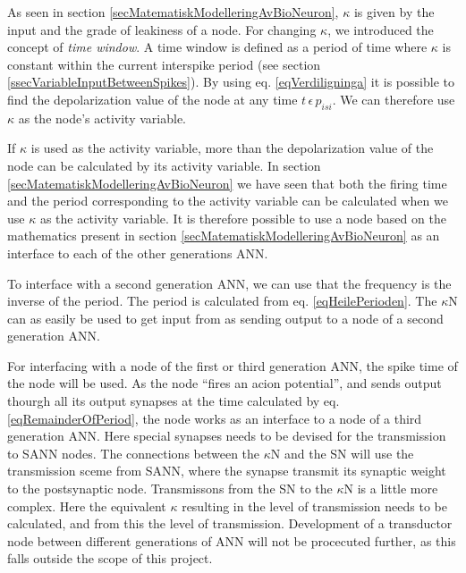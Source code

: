 	As seen in section \ref{secMatematiskModelleringAvBioNeuron}, $\kappa$ is given by the input and the grade of leakiness of a node.
	For changing $\kappa$, we introduced the concept of \emph{time window}. 
	A time window is defined as a period of time where $\kappa$ is constant within the current interspike period (see section \ref{ssecVariableInputBetweenSpikes}).
	By using eq. \eqref{eqVerdiligninga} it is possible to find the depolarization value of the node at any time $t \, \epsilon \, p_{isi}$.
	We can therefore use $\kappa$ as the node's activity variable.

	If $\kappa$ is used as the activity variable, more than the depolarization value of the node can be calculated by its activity variable. 
	In section \ref{secMatematiskModelleringAvBioNeuron} we have seen that both the firing time and the period corresponding to the activity variable can be calculated when we use $\kappa$ as the activity variable.
	It is therefore possible to use a node based on the mathematics present in section \ref{secMatematiskModelleringAvBioNeuron} as an interface to each of the other generations ANN.

	To interface with a second generation ANN, we can use that the frequency is the inverse of the period. The period is calculated from eq. \eqref{eqHeilePerioden}.
	The $\kappa$N can as easily be used to get input from as sending output to a node of a second generation ANN.

	For interfacing with a node of the first or third generation ANN, the spike time of the node will be used. %
	As the node ``fires an acion potential'', and sends output thourgh all its output synapses at the time calculated by eq. \eqref{eqRemainderOfPeriod}, the node works as an interface to a node of a third generation ANN. 
	Here special synapses needs to be devised for the transmission to SANN nodes. 
	The connections between the $\kappa$N and the SN will use the transmission sceme from SANN, where the synapse transmit its synaptic weight to the postsynaptic node. 
	Transmissons from the SN to  the $\kappa$N is a little more complex. Here the equivalent $\kappa$ resulting in the level of transmission needs to be calculated, and from this the level of transmission.
	Development of a transductor node between different generations of ANN will not be procecuted further, as this falls outside the scope of this project.

